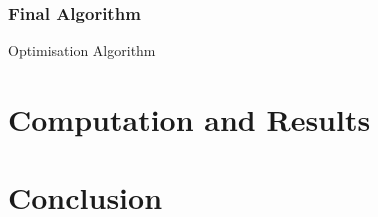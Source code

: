 \documentclass{article}
\begin{document}
\subsubsection{Final Algorithm}

\begin{algorithm}[H]
    \SetAlgoLined
    \caption{Optimisation Algorithm}
\end{algorithm}

\section{Computation and Results}



\section{Conclusion}




\end{document}
